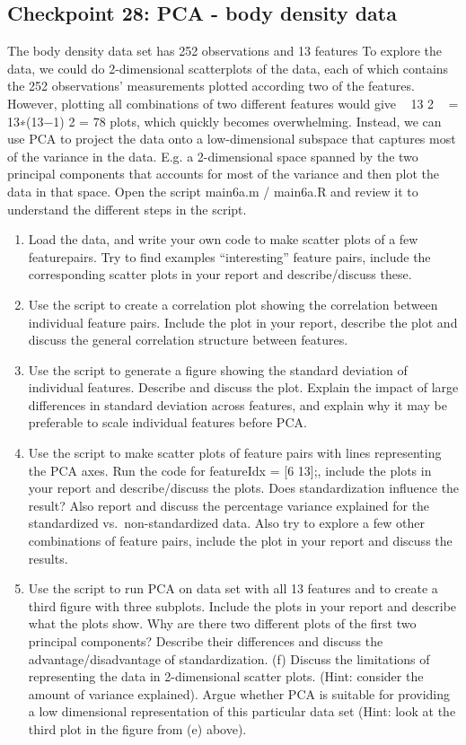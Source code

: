 \documentclass[
  letterpaper,
  DIV=11,
  numbers=noendperiod]{scrartcl}
\begin{document}
\hypertarget{checkpoint-28-pca---body-density-data}{%
\subsection{Checkpoint 28: PCA - body density
data}\label{checkpoint-28-pca---body-density-data}}

The body density data set has 252 observations and 13 features To
explore the data, we could do 2-dimensional scatterplots of the data,
each of which contains the 252 observations' measurements plotted
according two of the features. However, plotting all combinations of two
different features would give   13 2   = 13∗(13−1) 2 = 78 plots, which
quickly becomes overwhelming. Instead, we can use PCA to project the
data onto a low-dimensional subspace that captures most of the variance
in the data. E.g. a 2-dimensional space spanned by the two principal
components that accounts for most of the variance and then plot the data
in that space. Open the script main6a.m / main6a.R and review it to
understand the different steps in the script.

\begin{enumerate}
\def\labelenumi{(\alph{enumi})}
\item
  Load the data, and write your own code to make scatter plots of a few
  featurepairs. Try to find examples ``interesting'' feature pairs,
  include the corresponding scatter plots in your report and
  describe/discuss these.
\item
  Use the script to create a correlation plot showing the correlation
  between individual feature pairs. Include the plot in your report,
  describe the plot and discuss the general correlation structure
  between features.
\item
  Use the script to generate a figure showing the standard deviation of
  individual features. Describe and discuss the plot. Explain the impact
  of large differences in standard deviation across features, and
  explain why it may be preferable to scale individual features before
  PCA.
\item
  Use the script to make scatter plots of feature pairs with lines
  representing the PCA axes. Run the code for featureIdx = {[}6 13{]};,
  include the plots in your report and describe/discuss the plots. Does
  standardization influence the result? Also report and discuss the
  percentage variance explained for the standardized
  vs.~non-standardized data. Also try to explore a few other
  combinations of feature pairs, include the plot in your report and
  discuss the results.
\item
  Use the script to run PCA on data set with all 13 features and to
  create a third figure with three subplots. Include the plots in your
  report and describe what the plots show. Why are there two different
  plots of the first two principal components? Describe their
  differences and discuss the advantage/disadvantage of standardization.
  (f) Discuss the limitations of representing the data in 2-dimensional
  scatter plots. (Hint: consider the amount of variance explained).
  Argue whether PCA is suitable for providing a low dimensional
  representation of this particular data set (Hint: look at the third
  plot in the figure from (e) above).
\end{enumerate}
\end{document}
